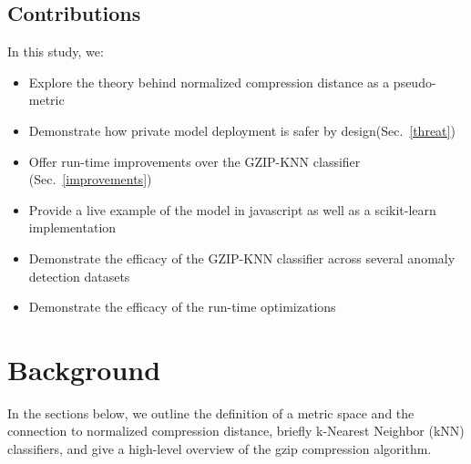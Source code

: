 \documentclass{article}
\begin{document}
\subsection{Contributions}

In this study, we:

\begin{itemize}
    \item Explore the theory behind normalized compression distance as a pseudo-metric
    \item Demonstrate how private model deployment is safer by design(Sec.~\ref{threat})
    \item Offer run-time improvements over the GZIP-KNN classifier (Sec.~\ref{improvements})
    \item Provide a live example of the model in javascript as well as a scikit-learn implementation
    \item Demonstrate the efficacy of the GZIP-KNN classifier across several anomaly detection datasets
    \item Demonstrate the efficacy of the run-time optimizations
\end{itemize}


\section{Background}

In the sections below, we outline the definition of a metric space and the connection to normalized compression distance, briefly k-Nearest Neighbor (kNN) classifiers, and give a high-level overview of the gzip compression algorithm.
\end{document}
